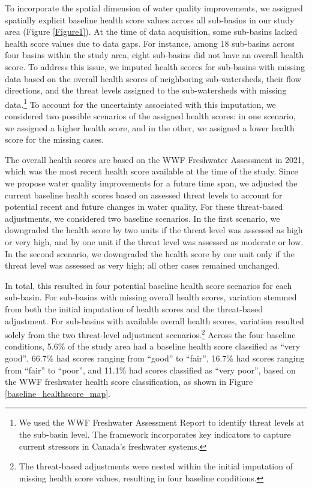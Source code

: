 \documentclass[12pt]{article}
\begin{document}
To incorporate the spatial dimension of water quality improvements, we assigned spatially explicit baseline health score values across all 
sub-basins in our study area (Figure \ref{Figure1}). At the time of data acquisition, some sub-basins lacked health score values due to 
data gaps. For instance, among 18 sub-basins across four basins within the study area, eight sub-basins did not have an overall health 
score. To address this issue, we imputed health scores for sub-basins with missing data based on the overall health scores of 
neighboring sub-watersheds, their flow directions, and the threat levels assigned to the sub-watersheds with missing data.\footnote{We 
used the WWF Freshwater Assessment Report to identify threat levels at the sub-basin level. The framework incorporates key indicators to 
capture current stressors in Canada’s freshwater systems.} To account for the uncertainty associated with this imputation, we considered 
two possible scenarios of the assigned health scores: in one scenario, we assigned a higher health score, and in the other, we assigned a 
lower health score for the missing cases.

The overall health scores are based on the WWF Freshwater Assessment in 2021, which was the most recent health score available at the 
time of the study. Since we propose water quality improvements for a future time span, we adjusted the current baseline health scores based 
on assessed threat levels to account for potential recent and future changes in water quality. For these threat-based adjustments, we 
considered two baseline scenarios. In the first scenario, we downgraded the health score by two units if the threat level was assessed as 
high or very high, and by one unit if the threat level was assessed as moderate or low. In the second scenario, we downgraded the health 
score by one unit only if the threat level was assessed as very high; all other cases remained unchanged.

In total, this resulted in four potential baseline health score scenarios for each sub-basin. For sub-basins with missing overall health 
scores, variation stemmed from both the initial imputation of health scores and the threat-based adjustment. For sub-basins with available 
overall health scores, variation resulted solely from the two threat-level adjustment scenarios.\footnote{The threat-based adjustments 
were nested within the initial imputation of missing health score values, resulting in four baseline conditions.} Across the four baseline 
conditions, 5.6\% of the study area had a baseline health score classified as “very good”, 66.7\% had scores ranging from “good” to 
“fair”, 16.7\% had scores ranging from “fair” to “poor”, and 11.1\% had scores classified as “very poor”, based on the WWF freshwater health 
score classification, as shown in Figure \ref{baseline_healthscore_map}.
\end{document}
